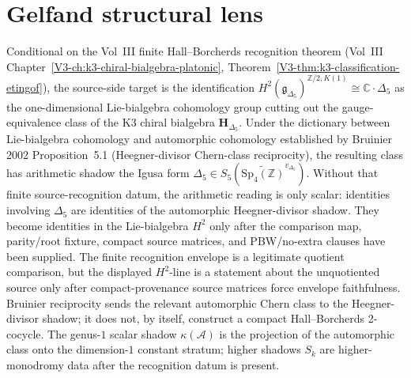 
\section{Gelfand structural lens}
\label{sec:as-gelfand-supplement}

\begin{remark}
\label{rem:as-gelfand-ek-cohomology}
Conditional on the Vol~III finite Hall--Borcherds recognition theorem
(Vol~III Chapter~\ref*{V3-ch:k3-chiral-bialgebra-platonic},
Theorem~\ref*{V3-thm:k3-classification-etingof}), the source-side
target is the identification
$H^2(\mathfrak{g}_{\Delta_5})^{\mathbb{Z}/2, K(1)} \cong \mathbb{C}\cdot\Delta_5$
as the one-dimensional Lie-bialgebra cohomology group cutting out the
gauge-equivalence class of the K3 chiral bialgebra $\mathbf{H}_{\Delta_5}$.
Under the dictionary between Lie-bialgebra cohomology and automorphic
cohomology established by Bruinier 2002 Proposition~5.1 (Heegner-divisor
Chern-class reciprocity), the resulting class has arithmetic shadow the
Igusa form $\Delta_5\in S_5(\widetilde{\mathrm{Sp}_4(\mathbb{Z})}^{v_{\Delta_5}})$.
Without that finite source-recognition datum, the arithmetic reading is
only scalar: identities involving $\Delta_5$ are identities of the
automorphic Heegner-divisor shadow. They become identities in the
Lie-bialgebra \(H^2\) only after the comparison map, parity/root fixture,
compact source matrices, and PBW/no-extra clauses have been supplied.
The finite recognition envelope is a legitimate quotient comparison,
but the displayed \(H^2\)-line is a statement about the unquotiented
source only after compact-provenance source matrices force envelope
faithfulness.
Bruinier reciprocity sends the relevant automorphic Chern class to the
Heegner-divisor shadow; it does not, by itself, construct a compact
Hall--Borcherds 2-cocycle. The genus-$1$ scalar shadow
$\kappa(\mathcal{A})$ is the projection of the automorphic class onto the
dimension-$1$ constant stratum; higher shadows $S_k$ are higher-monodromy
data after the recognition datum is present.
\end{remark}

